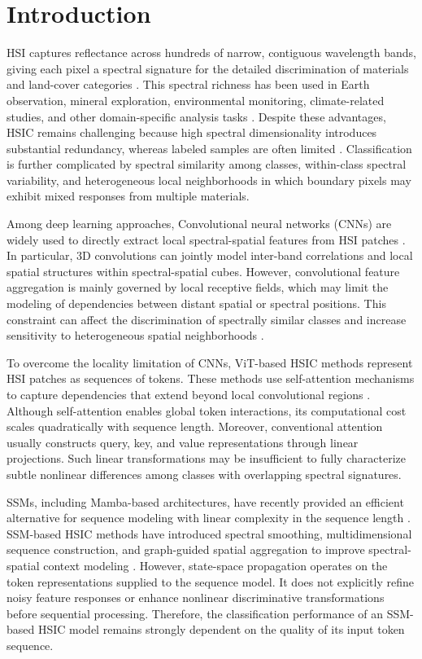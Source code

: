 \documentclass{ieeeaccess}
\begin{document}
\section{Introduction}
\label{intro}
HSI captures reflectance across hundreds of narrow, contiguous wavelength bands, giving each pixel a spectral signature for the detailed discrimination of materials and land-cover categories \cite{ref1}. This spectral richness has been used in Earth observation, mineral exploration, environmental monitoring, climate-related studies, and other domain-specific analysis tasks \cite{ref2,ref4,ref5,ref6,ref7,ref8,ref9,ref_itt}. Despite these advantages, HSIC remains challenging because high spectral dimensionality introduces substantial redundancy, whereas labeled samples are often limited \cite{ref_act}. Classification is further complicated by spectral similarity among classes, within-class spectral variability, and heterogeneous local neighborhoods in which boundary pixels may exhibit mixed responses from multiple materials.

Among deep learning approaches, Convolutional neural networks (CNNs) are widely used to directly extract local spectral-spatial features from HSI patches \cite{ref10,ref11,ref12,ref13,ref14}. In particular, 3D convolutions can jointly model inter-band correlations and local spatial structures within spectral-spatial cubes. However, convolutional feature aggregation is mainly governed by local receptive fields, which may limit the modeling of dependencies between distant spatial or spectral positions. This constraint can affect the discrimination of spectrally similar classes and increase sensitivity to heterogeneous spatial neighborhoods \cite{ref15,ref16}.

To overcome the locality limitation of CNNs, ViT-based HSIC methods represent HSI patches as sequences of tokens. These methods use self-attention mechanisms to capture dependencies that extend beyond local convolutional regions \cite{ref17,ref18,ref19}. Although self-attention enables global token interactions, its computational cost scales quadratically with sequence length. Moreover, conventional attention usually constructs query, key, and value representations through linear projections. Such linear transformations may be insufficient to fully characterize subtle nonlinear differences among classes with overlapping spectral signatures.

SSMs, including Mamba-based architectures, have recently provided an efficient alternative for sequence modeling with linear complexity in the sequence length \cite{ref20,ref21}. SSM-based HSIC methods have introduced spectral smoothing, multidimensional sequence construction, and graph-guided spatial aggregation to improve spectral-spatial context modeling \cite{ref22,ref23,ref_dima}. However, state-space propagation operates on the token representations supplied to the sequence model. It does not explicitly refine noisy feature responses or enhance nonlinear discriminative transformations before sequential processing. Therefore, the classification performance of an SSM-based HSIC model remains strongly dependent on the quality of its input token sequence.
\end{document}
